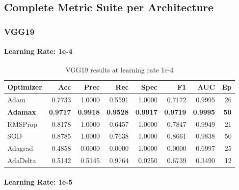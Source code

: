 
\subsection{Complete Metric Suite per Architecture}
\label{appx:per-arch-results}

\subsubsection{VGG19}
\label{appx:vgg19}

\paragraph{Learning Rate: 1e-4}

\begingroup
\tiny
\setlength{\tabcolsep}{2.5pt}
\begin{table}[H]
  \centering
  \caption{VGG19 results at learning rate 1e-4}
  \label{tab:vgg19-1e4}
  \begin{tabular}{l r r r r r r r}
    \toprule
    \rowcolor{tableheader}
    \textbf{Optimizer} & \textbf{Acc} & \textbf{Prec} & \textbf{Rec} &
    \textbf{Spec} & \textbf{F1} & \textbf{AUC} & \textbf{Ep} \\
    \midrule
    Adam     & 0.7733 & 1.0000 & 0.5591 & 1.0000 & 0.7172 & 0.9995 & 26 \\
    \textbf{Adamax}   & \textbf{0.9717} & \textbf{0.9918} & \textbf{0.9528} & \textbf{0.9917} & \textbf{0.9719} & \textbf{0.9995} & \textbf{50} \\
    RMSProp  & 0.8178 & 1.0000 & 0.6457 & 1.0000 & 0.7847 & 0.9949 & 21 \\
    SGD      & 0.8785 & 1.0000 & 0.7638 & 1.0000 & 0.8661 & 0.9838 & 50 \\
    Adagrad  & 0.4858 & 0.0000 & 0.0000 & 1.0000 & 0.0000 & 0.6997 & 25 \\
    AdaDelta & 0.5142 & 0.5145 & 0.9764 & 0.0250 & 0.6739 & 0.3490 & 12 \\
    \bottomrule
  \end{tabular}
\end{table}
\endgroup

\paragraph{Learning Rate: 1e-5}

